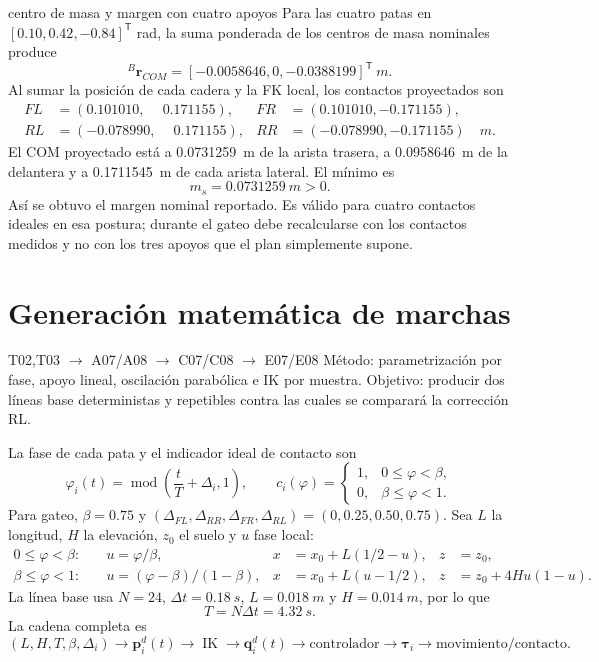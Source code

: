 \documentclass[11pt,letterpaper]{article}
\newcommand{\vect}[1]{\bm{#1}}
\newcommand{\trans}{^{\mathsf T}}
\newcommand{\IK}{\operatorname{IK}}
\begin{document}
\begin{workedexample}{centro de masa y margen con cuatro apoyos}
Para las cuatro patas en $[0.10,0.42,-0.84]\trans$ rad, la suma ponderada de
los centros de masa nominales produce
\[
 {}^B\vect r_{COM}=\boxed{[-0.0058646,0,-0.0388199]\trans\ \si{m}}.
\]
Al sumar la posición de cada cadera y la FK local, los contactos proyectados son
\begin{align*}
 FL&=(0.101010,\phantom{-}0.171155),&
 FR&=(0.101010,-0.171155),\\
 RL&=(-0.078990,\phantom{-}0.171155),&
 RR&=(-0.078990,-0.171155)\quad\si{m}.
\end{align*}
El COM proyectado está a \SI{0.0731259}{m} de la arista trasera, a
\SI{0.0958646}{m} de la delantera y a \SI{0.1711545}{m} de cada arista lateral.
El mínimo es
\[
 \boxed{m_s=\SI{0.0731259}{m}>0}.
\]
Así se obtuvo el margen nominal reportado. Es válido para cuatro contactos
ideales en esa postura; durante el gateo debe recalcularse con los contactos
medidos y no con los tres apoyos que el plan simplemente supone.
\end{workedexample}

\section{Generación matemática de marchas}
\begin{tracebox}{T02,T03 $\rightarrow$ A07/A08 $\rightarrow$ C07/C08 $\rightarrow$ E07/E08}
Método: parametrización por fase, apoyo lineal, oscilación parabólica e IK por
muestra. Objetivo: producir dos líneas base deterministas y repetibles contra
las cuales se comparará la corrección RL.
\end{tracebox}
La fase de cada pata y el indicador ideal de contacto son
\begin{equation}
 \varphi_i(t)=\operatorname{mod}\left(\frac{t}{T}+\Delta_i,1\right),\qquad
 c_i(\varphi)=\begin{cases}1,&0\le\varphi<\beta,\\0,&\beta\le\varphi<1.
 \end{cases}\label{eq:gaitphase}
\end{equation}
Para gateo, $\beta=0.75$ y
$(\Delta_{FL},\Delta_{RR},\Delta_{FR},\Delta_{RL})=(0,0.25,0.50,0.75)$.
Sea $L$ la longitud, $H$ la elevación, $z_0$ el suelo y $u$ fase local:
\begin{align}
 0\le\varphi<\beta:\quad &u=\varphi/\beta,&
 x&=x_0+L(1/2-u),&z&=z_0,\label{eq:stance}\\
 \beta\le\varphi<1:\quad &u=(\varphi-\beta)/(1-\beta),&
 x&=x_0+L(u-1/2),&z&=z_0+4Hu(1-u).\label{eq:swing}
\end{align}
La línea base usa $N=24$, $\Delta t=\SI{0.18}{s}$, $L=\SI{0.018}{m}$ y
$H=\SI{0.014}{m}$, por lo que
\begin{equation}T=N\Delta t=\SI{4.32}{s}.\end{equation}
La cadena completa es
\begin{equation}
 (L,H,T,\beta,\Delta_i)\rightarrow\vect p_i^d(t)\rightarrow\IK
 \rightarrow\vect q_i^d(t)\rightarrow\text{controlador}\rightarrow
 \vect\tau_i\rightarrow\text{movimiento/contacto}.\label{eq:motionchain}
\end{equation}
\end{document}
